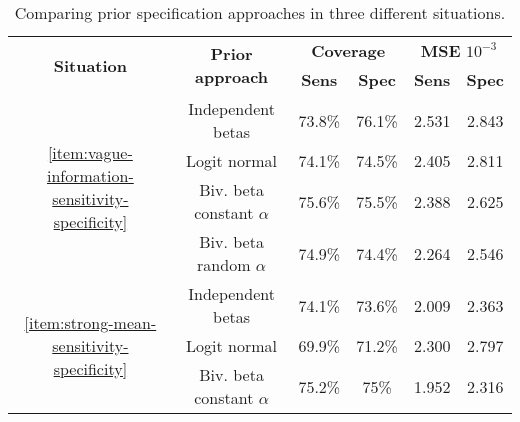 \begin{table}[tbp]
  \centering
  \caption{\label{tab:comparison-prior-approach-sensitivity-specificity}Comparing
    prior specification approaches in three different situations.}
  \begin{tabular}{cccccc}
    \hline
    \multirow{2}{*}{\textbf{Situation}}                                                 & \multirow{2}{*}{\textbf{Prior
    approach}}                                                                          & \multicolumn{2}{c}{\textbf{Coverage}} &
    \multicolumn{2}{c}{\textbf{MSE} $10^{-3}$}                                                                                                                                              \\ \cline{3-6}
                                                                                        &                                   & \textbf{Sens} & \textbf{Spec} & \textbf{Sens} & \textbf{Spec} \\ \hline
    \multirow{4}{*}{\autoref{item:vague-information-sensitivity-specificity}}           & Independent betas                 & 73.8\%        & 76.1\%        & 2.531         & 2.843         \\
                                                                                        & Logit normal                      & 74.1\%        & 74.5\%        & 2.405         & 2.811         \\
                                                                                        & Biv. beta constant $\alpha$       & 75.6\%        & 75.5\%        & 2.388         & 2.625         \\
                                                                                        & Biv. beta random $\alpha$         & 74.9\%        & 74.4\%        & 2.264         & 2.546         \\\hline
    \multirow{4}{*}{\autoref{item:strong-mean-sensitivity-specificity}}                 & Independent betas                 & 74.1\%        & 73.6\%        & 2.009         & 2.363         \\
                                                                                        & Logit normal                      & 69.9\%        & 71.2\%        & 2.300         & 2.797         \\
                                                                                        & Biv. beta constant $\alpha$       & 75.2\%        & 75\%          & 1.952         & 2.316         \\

\end{tabular}
\end{table}
